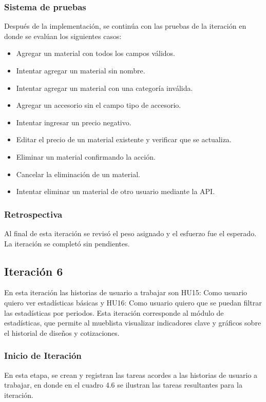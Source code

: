 ﻿\documentclass{iccmemoria}
\begin{document}
\subsubsection{Sistema de pruebas}
Después de la implementación, se continúa con las pruebas de la iteración en donde se evalúan los siguientes casos:
\begin{itemize}
    \item Agregar un material con todos los campos válidos.
    \item Intentar agregar un material sin nombre.
    \item Intentar agregar un material con una categoría inválida.
    \item Agregar un accesorio sin el campo tipo de accesorio.
    \item Intentar ingresar un precio negativo.
    \item Editar el precio de un material existente y verificar que se actualiza.
    \item Eliminar un material confirmando la acción.
    \item Cancelar la eliminación de un material.
    \item Intentar eliminar un material de otro usuario mediante la API.
\end{itemize}

\subsubsection{Retrospectiva}
Al final de esta iteración se revisó el peso asignado y el esfuerzo fue el esperado. La iteración se completó sin pendientes.

\subsection{Iteración 6}
En esta iteración las historias de usuario a trabajar son HU15: Como usuario quiero ver estadísticas básicas y HU16: Como usuario quiero que se puedan filtrar las estadísticas por periodos. Esta iteración corresponde al módulo de estadísticas, que permite al mueblista visualizar indicadores clave y gráficos sobre el historial de diseños y cotizaciones.

\subsubsection{Inicio de Iteración}
En esta etapa, se crean y registran las tareas acordes a las historias de usuario a trabajar, en donde en el cuadro 4.6 se ilustran las tareas resultantes para la iteración.
\end{document}
